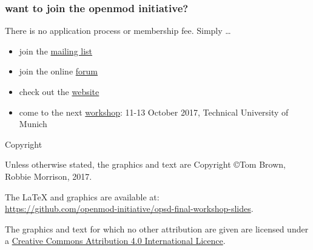 \documentclass[12pt,aspectratio=169]{beamer}
\let\olditem\item
\renewcommand{\item}{%
\olditem\vspace{5pt}}
\begin{document}
\begin{frame}
  \frametitle{want to join the openmod initiative?}

  There is no application process or membership fee. Simply \dots
  \begin{itemize}
  \item join the \alert{\href{https://groups.google.com/forum/\#!forum/openmod-initiative}{mailing list}}
  \item join the online \alert{\href{https://forum.openmod-initiative.org/}{forum}}
  \item check out the \alert{\href{http://openmod-initiative.org/}{website}}
  \item come to the next \alert{\href{https://wiki.openmod-initiative.org/wiki/Open_Energy_Modelling_Workshop_-_Munich_2017}{workshop}}: 11-13 October 2017,
    Technical University of Munich
  \end{itemize}

\end{frame}
\begin{frame}{Copyright}


  Unless otherwise stated, the graphics and text are Copyright \copyright Tom Brown, Robbie Morrison, 2017.

  The   LaTeX and graphics are available at:\\ {\small\url{https://github.com/openmod-initiative/opsd-final-workshop-slides}}.


  The graphics and text for which no other attribution are given are licensed under a
  \href{http://creativecommons.org/licenses/by/4.0/}{Creative Commons
  Attribution 4.0 International Licence}.

  \begin{center}\ccby\end{center}

\end{frame}
\end{document}
